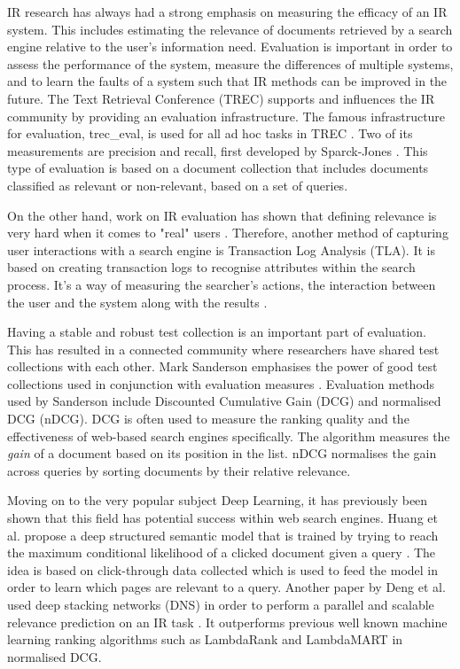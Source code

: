 IR research has always had a strong emphasis on measuring the efficacy of an IR system. This includes estimating the relevance of documents retrieved by a search engine relative to the user's information need. Evaluation is important in order to assess the performance of the system, measure the differences of multiple systems, and to learn the faults of a system such that IR methods can be improved in the future. The Text Retrieval Conference (TREC) supports and influences the IR community by providing an evaluation infrastructure. The famous infrastructure for evaluation, trec\_eval, is used for all ad hoc tasks in TREC \cite{voorhees:evaluation}. Two of its measurements are precision and recall, first developed by Sparck-Jones \cite{jones1981information}. This type of evaluation is based on a document collection that includes documents classified as relevant or non-relevant, based on a set of queries.

On the other hand, work on IR evaluation has shown that defining relevance is very hard when it comes to "real" users \cite{mizzaro1997relevance}. Therefore, another method of capturing user interactions with a search engine is Transaction Log Analysis (TLA). It is based on creating transaction logs to recognise attributes within the search process. It's a way of measuring the searcher's actions, the interaction between the user and the system along with the results \cite{glaser1967discovery}. 

Having a stable and robust test collection is an important part of evaluation. This has resulted in a connected community where researchers have shared test collections with each other. Mark Sanderson emphasises the power of good test collections used in conjunction with evaluation measures \cite{sanderson:evaluation}. Evaluation methods used by Sanderson include Discounted Cumulative Gain (DCG) and normalised DCG (nDCG). DCG is often used to measure the ranking quality and the effectiveness of web-based search engines specifically. The algorithm measures the \textit{gain} of a document based on its position in the list. nDCG normalises the gain across queries by sorting documents by their relative relevance.

Moving on to the very popular subject Deep Learning, it has previously been shown that this field has potential success within web search engines. Huang et al. propose a deep structured semantic model that is trained by trying to reach the maximum conditional likelihood of a clicked document given a query \cite{huang2013learning}. The idea is based on click-through data collected which is used to feed the model in order to learn which pages are relevant to a query. Another paper by Deng et al. used deep stacking networks (DNS) in order to perform a parallel and scalable relevance prediction on an IR task \cite{deng2013deep}. It outperforms previous well known machine learning ranking algorithms such as LambdaRank and LambdaMART \cite{burges2010ranknet} in normalised DCG. 

